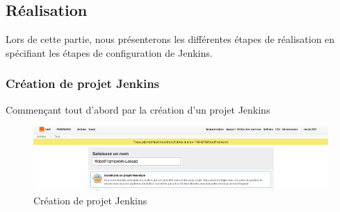 \subsection{Réalisation}
Lors de cette partie, nous présenterons les différentes étapes de réalisation en spécifiant les étapes de configuration de Jenkins.\newpage
\subsubsection{Création de projet Jenkins}
Commençant tout d’abord par la création d’un projet Jenkins
\begin{figure}[H]
	\centering
	\includegraphics[width=0.9\linewidth]{"img/jenkins/creation projet"}
	\caption[Création de projet Jenkins]{Création de projet Jenkins}
	\label{fig:creation-projet}
\end{figure}

